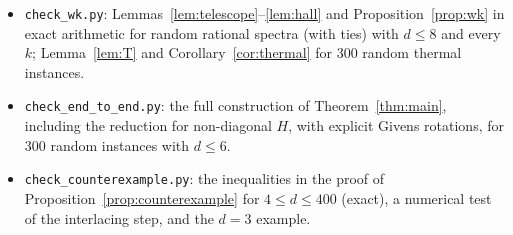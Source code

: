 \documentclass[11pt]{amsart}
\theoremstyle{definition}
\theoremstyle{remark}
\numberwithin{equation}{section}
\newcommand{\sT}{\mathsf{T}}
\newcommand{\sH}{\mathsf{H}}
\newcommand{\sG}{\mathsf{G}}
\newcommand{\lean}[1]{\texttt{#1}}
\begin{document}
\begin{itemize}
$\sT,\sH,\sG$.
\item \lean{check\_wk.py}: Lemmas~\ref{lem:telescope}--\ref{lem:hall} and Proposition~\ref{prop:wk} in
exact arithmetic for random rational spectra (with ties) with $d\le8$ and every $k$; Lemma~\ref{lem:T}
and Corollary~\ref{cor:thermal} for $300$ random thermal instances.
\item \lean{check\_end\_to\_end.py}: the full construction of Theorem~\ref{thm:main}, including the
reduction for non-diagonal $H$, with explicit Givens rotations, for $300$ random instances with $d\le6$.
\item \lean{check\_counterexample.py}: the inequalities in the proof of
Proposition~\ref{prop:counterexample} for $4\le d\le400$ (exact), a numerical test of the interlacing
step, and the $d=3$ example.
\end{itemize}



\end{document}
